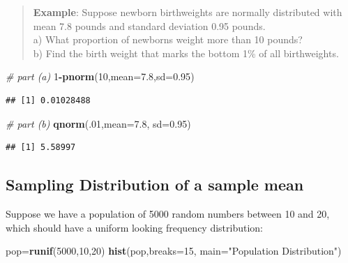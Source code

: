 \documentclass[
]{book}
\newenvironment{Shaded}{\begin{snugshade}}{\end{snugshade}}
\newcommand{\AttributeTok}[1]{\textcolor[rgb]{0.13,0.29,0.53}{#1}}
\newcommand{\CommentTok}[1]{\textcolor[rgb]{0.56,0.35,0.01}{\textit{#1}}}
\newcommand{\DecValTok}[1]{\textcolor[rgb]{0.00,0.00,0.81}{#1}}
\newcommand{\FloatTok}[1]{\textcolor[rgb]{0.00,0.00,0.81}{#1}}
\newcommand{\FunctionTok}[1]{\textcolor[rgb]{0.13,0.29,0.53}{\textbf{#1}}}
\newcommand{\NormalTok}[1]{#1}
\newcommand{\OtherTok}[1]{\textcolor[rgb]{0.56,0.35,0.01}{#1}}
\newcommand{\SpecialCharTok}[1]{\textcolor[rgb]{0.81,0.36,0.00}{\textbf{#1}}}
\newcommand{\StringTok}[1]{\textcolor[rgb]{0.31,0.60,0.02}{#1}}
\theoremstyle{definition}
\theoremstyle{definition}
\theoremstyle{definition}
\theoremstyle{definition}
\theoremstyle{remark}
\begin{document}
\begin{quote}
\textbf{Example}: Suppose newborn birthweights are normally distributed with mean 7.8 pounds and standard deviation 0.95 pounds.\\
a) What proportion of newborns weight more than 10 pounds?\\
b) Find the birth weight that marks the bottom 1\% of all birthweights.
\end{quote}

\begin{Shaded}
\begin{Highlighting}[]
\CommentTok{\# part (a)}
\DecValTok{1}\SpecialCharTok{{-}}\FunctionTok{pnorm}\NormalTok{(}\DecValTok{10}\NormalTok{,}\AttributeTok{mean=}\FloatTok{7.8}\NormalTok{,}\AttributeTok{sd=}\FloatTok{0.95}\NormalTok{)}
\end{Highlighting}
\end{Shaded}

\begin{verbatim}
## [1] 0.01028488
\end{verbatim}

\begin{Shaded}
\begin{Highlighting}[]
\CommentTok{\# part (b)}
\FunctionTok{qnorm}\NormalTok{(.}\DecValTok{01}\NormalTok{,}\AttributeTok{mean=}\FloatTok{7.8}\NormalTok{, }\AttributeTok{sd=}\FloatTok{0.95}\NormalTok{)}
\end{Highlighting}
\end{Shaded}

\begin{verbatim}
## [1] 5.58997
\end{verbatim}

\subsection*{Sampling Distribution of a sample mean}\label{sampling-distribution-of-a-sample-mean}

Suppose we have a population of 5000 random numbers between 10 and 20, which should have a uniform looking frequency distribution:

\begin{Shaded}
\begin{Highlighting}[]
\NormalTok{pop}\OtherTok{=}\FunctionTok{runif}\NormalTok{(}\DecValTok{5000}\NormalTok{,}\DecValTok{10}\NormalTok{,}\DecValTok{20}\NormalTok{)}
\FunctionTok{hist}\NormalTok{(pop,}\AttributeTok{breaks=}\DecValTok{15}\NormalTok{, }\AttributeTok{main=}\StringTok{"Population Distribution"}\NormalTok{)}
\end{Highlighting}
\end{Shaded}
\end{document}
